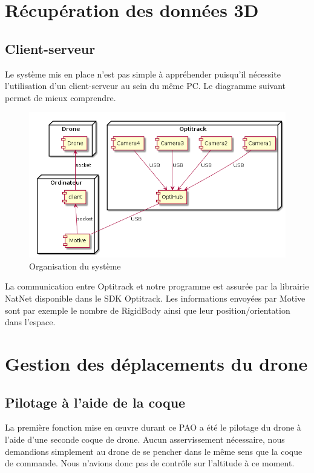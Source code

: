     \section{Récupération des données 3D}

        \subsection{Client-serveur}
            Le système mis en place n'est pas simple à appréhender puisqu'il nécessite l'utilisation d'un client-serveur au sein du même PC. Le diagramme suivant permet de mieux comprendre.
            
           \begin{figure}[h]
		\includegraphics[width=13cm]{images/diagramme_Composant.png}
	 	\caption{Organisation du système}
	 \end{figure}
	 La communication entre Optitrack et notre programme est assurée par la librairie NatNet disponible dans le SDK Optitrack. Les informations envoyées par Motive sont par exemple le nombre de RigidBody ainsi que leur position/orientation dans l'espace.\newpage

    \section{Gestion des déplacements du drone}

        \subsection{Pilotage à l'aide de la coque}
           La première fonction mise en œuvre durant ce PAO a été le pilotage du drone à l'aide d'une seconde coque de drone. Aucun asservissement nécessaire, nous demandions simplement au drone de se pencher dans le même sens que la coque de commande. Nous n'avions donc pas de contrôle sur l'altitude à ce moment.
           
